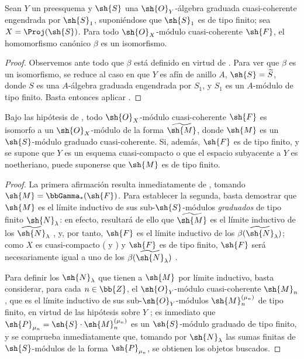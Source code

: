 \documentclass[oneside,10pt]{amsart}
\newcommand{\oldpage}[2][]{\marginnote{\normalfont\footnotesize\textbf{#1}~|~#2}\ignorespaces}
\let\EGAOriginalLabel\label
\renewcommand{\label}[1]{\phantomsection\EGAOriginalLabel{#1}}
\begin{document}
\begin{theorem}[3.4.4]
\label{II.3.4.4}
Sean $Y$ un preesquema y $\sh{S}$ una $\sh{O}_Y$-álgebra graduada cuasi-coherente engendrada por $\sh{S}_1$, suponiéndose que $\sh{S}_1$ es de tipo finito; sea $X=\Proj(\sh{S})$.
Para todo $\sh{O}_X$-módulo cuasi-coherente $\sh{F}$, el homomorfismo canónico $\beta$  es un isomorfismo.
\end{theorem}

\begin{proof}
Observemos ante todo que $\beta$ está definido en virtud de .
Para ver que $\beta$ es un isomorfismo, se reduce al caso en que $Y$ es afín de anillo $A$, $\sh{S}=\widetilde{S}$, donde $S$ es una $A$-álgebra graduada engendrada por $S_1$, y $S_1$ es un $A$-módulo de tipo finito.
Basta entonces aplicar .
\end{proof}

\begin{corollary}[3.4.5]
\label{II.3.4.5}
Bajo las hipótesis de , todo $\sh{O}_X$-módulo cuasi-coherente $\sh{F}$ es isomorfo a un $\sh{O}_X$-módulo de la forma $\widetilde{\sh{M}}$, donde $\sh{M}$ es un $\sh{S}$-módulo graduado cuasi-coherente.
Si, además, $\sh{F}$ es de tipo finito, y se supone que $Y$ es un esquema cuasi-compacto o que el espacio subyacente a $Y$ es noetheriano, puede suponerse que $\sh{M}$ es de tipo finito.
\end{corollary}

\oldpage[II]{60}
\begin{proof}
La primera afirmación resulta inmediatamente de , tomando $\sh{M}=\bbGamma_*(\sh{F})$.
Para establecer la segunda, basta demostrar que $\sh{M}$ es el límite inductivo de sus sub-$\sh{S}$-módulos \emph{graduados} de tipo finito $\sh{N}_\lambda$: en efecto, resultará de ello que $\widetilde{\sh{M}}$ es el límite inductivo de los $\widetilde{\sh{N}}_\lambda$ , y, por tanto, $\sh{F}$ es el límite inductivo de los $\beta(\widetilde{\sh{N}}_\lambda)$; como $X$ es cuasi-compacto ( y ) y $\sh{F}$ es de tipo finito, $\sh{F}$ será necesariamente igual a uno de los $\beta(\widetilde{\sh{N}}_\lambda)$ .

Para definir los $\sh{N}_\lambda$ que tienen a $\sh{M}$ por límite inductivo, basta considerar, para cada $n\in\bb{Z}$, el $\sh{O}_Y$-módulo cuasi-coherente $\sh{M}_n$, que es el límite inductivo de sus sub-$\sh{O}_Y$-módulos $\sh{M}_n^{(\mu_n)}$ de tipo finito, en virtud de las hipótesis sobre $Y$ ; es inmediato que $\sh{P}_{\mu_n}=\sh{S}\cdot\sh{M}_n^{(\mu_n)}$ es un $\sh{S}$-módulo graduado de tipo finito, y se comprueba inmediatamente que, tomando por $\sh{N}_\lambda$ las sumas finitas de $\sh{S}$-módulos de la forma $\sh{P}_{\mu_n}$, se obtienen los objetos buscados.
\end{proof}
\end{document}
